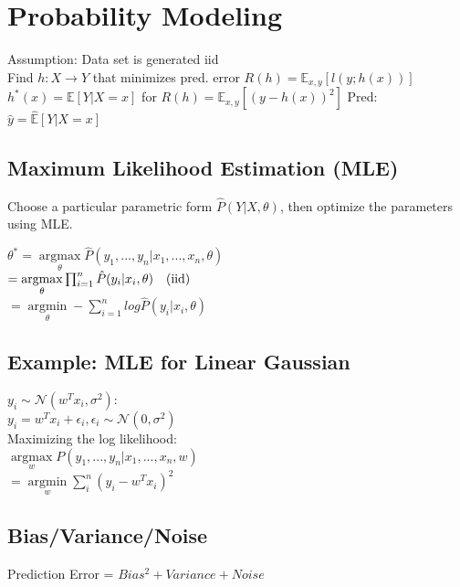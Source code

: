 \section*{Probability Modeling}
Assumption: Data set is generated iid\\
Find $h:X\rightarrow Y$ that minimizes pred. error $R(h) = \mathbb{E}_{x,y}[l(y;h(x))]$ 
$h^*(x) = \mathbb{E}[Y|X=x]$ for $R(h) = \mathbb{E}_{x,y}[(y-h(x))^2]$
Pred: $\hat{y} = \hat{\mathbb{E}}[Y|X=x]$

\subsection*{Maximum Likelihood Estimation (MLE)}
Choose a particular parametric form $\hat{P}(Y|X,\theta)$, then optimize the parameters using MLE.

$\theta^* = \underset{\theta}{\operatorname{argmax}} \hat{P}(y_1,...,y_n|x_1,...,x_n,\theta) $\\
$= \underset{\theta}{\operatorname{argmax}} \prod_{i=1}^n \hat{P}(y_i|x_i, \theta) \text{\quad (iid)}$\\
$= \underset{\theta}{\operatorname{argmin}} - \sum_{i=1}^n log \hat{P}(y_i|x_i,\theta)$\\

\subsection*{Example: MLE for Linear Gaussian}
$y_i \sim \mathcal{N} (w^T x_i, \sigma^2):$\\
$y_i = w^T x_i + \epsilon_i, \epsilon_i \sim \mathcal{N}(0, \sigma^2)$\\
Maximizing the log likelihood:\\
$\underset{w}{\operatorname{argmax}} P(y_1,...,y_n|x_1,...,x_n,w)$\\
$= \underset{w}{\operatorname{argmin}}  \sum_i^n (y_i-w^Tx_i)^2$

\subsection*{Bias/Variance/Noise}
Prediction Error = $Bias^2 + Variance + Noise$

